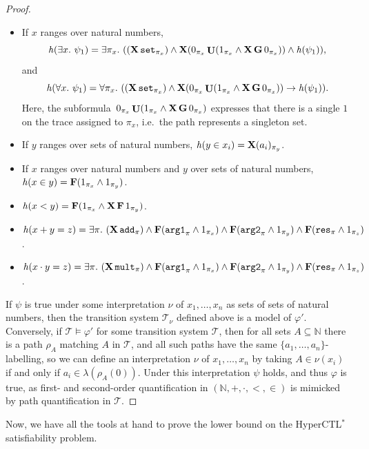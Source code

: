 \documentclass[dvipsnames,10pt,a4paper]{amsart}
\theoremstyle{definition}
\theoremstyle{remark}
\newcommand{\nats}{\mathbb{N}}
\newcommand\Nat{\nats}
\newcommand{\tsys}{\mathcal{T}}
\newcommand{\F}{\mathop{\mathbf{F}\vphantom{a}}\nolimits}
\newcommand{\G}{\mathop{\mathbf{G}\vphantom{a}}\nolimits}
\DeclareMathOperator{\U}{\mathbf{U}}
\newcommand{\X}{\mathop{\mathbf{X}\vphantom{a}}\nolimits}
\newcommand{\hyctlstar}{{HyperCTL$^*$}\xspace}
\newcommand\argl{\textup{\texttt{arg1}}}
\newcommand\argr{\textup{\texttt{arg2}}}
\newcommand\res{\textup{\texttt{res}}}
\newcommand\add{\textup{\texttt{add}}}
\newcommand\mult{\textup{\texttt{mult}}}
\newcommand\pset{\textup{\texttt{set}}}
\newcommand\xo{x}
\newcommand\yo{y}
\newcommand\zo{z}
\newcommand\ys{y}
\newcommand\xt{x}
\newcommand\yt{y}
\newcommand\ai[1]{a_{#1}}
\newcommand\pix[1]{\pi_{#1}}
\newcommand\inter{\nu}
\newcommand\tsysI{\tsys_{\inter}}
\newcommand\tr [1]{\mathit{h}(#1)}
\begin{document}
\begin{proof}
\begin{itemize}
  \item If $x$ ranges over natural numbers, 
    \[\tr {\exists x.\ \psi_1} = \exists \pix x.\ ((\X \pset_{\pix x}) \land
    \X (0_{\pix x} \U (1_{\pix x} \land \X\G 0_{\pix x})) \land \tr  {\psi_1}),\]
    and
    \[\tr {\forall x.\ \psi_1} = \forall \pix x.\ ((\X \pset_{\pix x}) \land
    \X (0_{\pix x} \U (1_{\pix x} \land \X\G 0_{\pix x})) \rightarrow \tr  {\psi_1}).\] 
    Here, the subformula~$0_{\pix x} \U (1_{\pix x} \land \X\G 0_{\pix x})$ expresses that there is a single $1$ on the trace assigned to $\pix x$, i.e.\ the path represents a singleton set.
  \item If $\ys$ ranges over sets of natural numbers,
    $\tr {\ys \in \xt_i} = \X (\ai i)_{\pix \ys}$.
  \item If $\xo$ ranges over natural numbers and $\yt$ over sets of natural
    numbers, $\tr {\xo \in \yt} = \F(1_{\pix \xo} \land 1_{\pix \yt})$.
  \item $\tr {\xo < \yo} = \F(1_{\pix \xo} \land \X \F 1_{\pix \yo})$.
  \item $\tr {\xo + \yo = \zo} = \exists \pi.\ (\X \add_\pi) \land \F(\argl_\pi \land 1_{\pix \xo}) \land
    \F(\argr_{\pi} \land 1_{\pix \yo}) \land \F(\res_\pi \land 1_{\pix \zo})$.
    \item $\tr {\xo\cdot\yo = \zo} =
    \exists \pi.\ (\X \mult_\pi) \land \F(\argl_\pi \land 1_{\pix \xo}) \land
    \F(\argr_{\pi} \land 1_{\pix \yo}) \land \F(\res_\pi \land 1_{\pix \zo})$.
  \end{itemize}

  If $\psi$ is true under some interpretation $\inter$ of $\xt_1, \ldots, \xt_n$
  as sets of sets of natural numbers,
  then the transition system $\tsysI$ defined above is a model of $\varphi'$.
  Conversely, if $\tsys \models \varphi'$ for some transition system $\tsys$,
  then for all sets $A \subseteq \Nat$ there is a path $\rho_A$ matching $A$ in $\tsys$,
  and all such paths have the same $\{\ai 1,\ldots,\ai n\}$-labelling, so we
  can define an interpretation $\inter$ of $\xt_1,\ldots,\xt_n$ by taking
  $A \in \inter(\xt_i)$ if and only if $\ai i \in \lambda(\rho_A(0))$.
  Under this interpretation $\psi$ holds, and thus $\varphi$ is true, as first- and second-order quantification in   $(\Nat, +, \cdot, <,\in)$ is mimicked by path quantification in $\tsys$.
\end{proof}

Now, we have all the tools at hand to prove the lower bound on the \hyctlstar satisfiability problem.
\end{document}
